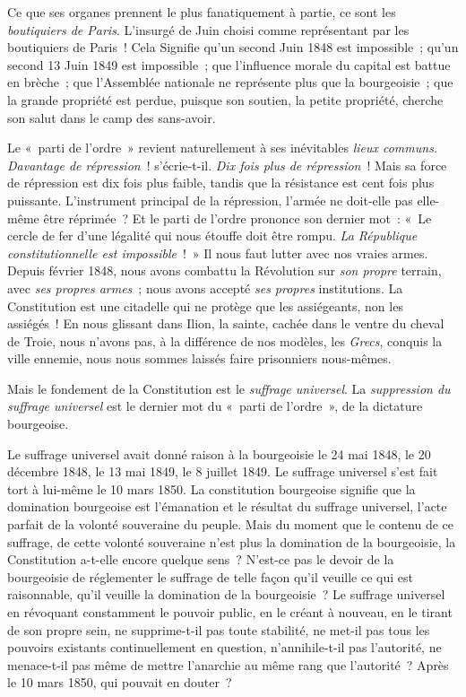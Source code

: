 \documentclass[twoside]{book} %
\begin{document}
Ce que ses organes prennent le plus fanatiquement à partie, ce sont les \emph{boutiquiers de Paris}. L’insurgé de Juin choisi comme représentant par les boutiquiers de Paris ! Cela Signifie qu’un second Juin 1848 est impossible ; qu’un second 13 Juin 1849 est impossible ; que l’influence morale du capital est battue en brèche ; que l’Assemblée nationale ne représente plus que la bourgeoisie ; que la grande propriété est perdue, puisque son soutien, la petite propriété, cherche son salut dans le camp des sans-avoir.\par
Le « parti de l’ordre » revient naturellement à ses inévitables \emph{lieux communs. Davantage de répression} ! s’écrie-t-il. \emph{Dix fois plus de répression} ! Mais sa force de répression est dix fois plus faible, tandis que la résistance est cent fois plus puissante. L’instrument principal de la répression, l’armée ne doit-elle pas elle-même être réprimée ? Et le parti de l’ordre prononce son dernier mot : « Le cercle de fer d’une légalité qui nous étouffe doit être rompu. \emph{La République constitutionnelle est impossible} ! » Il nous faut lutter avec nos vraies armes. Depuis février 1848, nous avons combattu la Révolution sur \emph{son propre} terrain, avec \emph{ses propres armes} ; nous avons accepté \emph{ses propres} institutions. La Constitution est une citadelle qui ne protège que les assiégeants, non les assiégés ! En nous glissant dans Ilion, la sainte, cachée dans le ventre du cheval de Troie, nous n’avons pas, à la différence de nos modèles, les \emph{Grecs}, conquis la ville ennemie, nous nous sommes laissés faire prisonniers nous-mêmes.\par
Mais le fondement de la Constitution est le \emph{suffrage universel}. La \emph{suppression du suffrage universel} est le dernier mot du « parti de l’ordre », de la dictature bourgeoise.\par
Le suffrage universel avait donné raison à la bourgeoisie le 24 mai 1848, le 20 décembre 1848, le 13 mai 1849, le 8 juillet 1849. Le suffrage universel s’est fait tort à lui-même le 10 mars 1850. La constitution bourgeoise signifie que la domination bourgeoise est l’émanation et le résultat du suffrage universel, l’acte parfait de la volonté souveraine du peuple. Mais du moment que le contenu de ce suffrage, de cette volonté souveraine n’est plus la domination de la bourgeoisie, la Constitution a-t-elle encore quelque sens ? N’est-ce pas le devoir de la bourgeoisie de réglementer le suffrage de telle façon qu’il veuille ce qui est raisonnable, qu’il veuille la domination de la bourgeoisie ? Le suffrage universel en révoquant constamment le pouvoir public, en le créant à nouveau, en le tirant de son propre sein, ne supprime-t-il pas toute stabilité, ne met-il pas tous les pouvoirs existants continuellement en question, n’annihile-t-il pas l’autorité, ne menace-t-il pas même de mettre l’anarchie au même rang que l’autorité ? Après le 10 mars 1850, qui pouvait en douter ?\par
\end{document}
